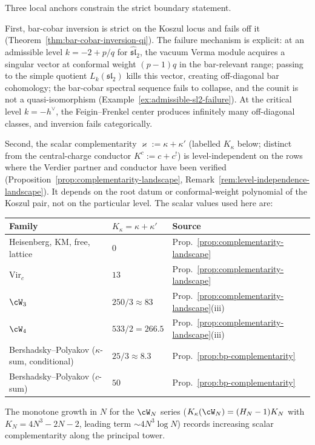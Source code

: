 \begin{remark}
\label{rem:koszul-swampland-evidence}
Three local anchors constrain the strict boundary statement.

First, bar-cobar inversion is strict on the Koszul locus
and fails off it
(Theorem~\ref{thm:bar-cobar-inversion-qi}).
The failure mechanism is explicit: at an admissible level
$k = -2 + p/q$ for $\widehat{\mathfrak{sl}}_2$, the
vacuum Verma module acquires a singular vector at
conformal weight $(p-1)q$ in the bar-relevant range; passing
to the simple quotient $L_k(\mathfrak{sl}_2)$ kills this
vector, creating off-diagonal bar cohomology; the bar-cobar
spectral sequence fails to collapse, and the counit is not a
quasi-isomorphism
(Example~\ref{ex:admissible-sl2-failure}).
At the critical level $k = -h^\vee$, the Feigin--Frenkel
center produces infinitely many off-diagonal classes, and
inversion fails categorically.

Second, the scalar complementarity $\varkappa := \kappa + \kappa'$
(labelled $K_\kappa$ below; distinct from the central-charge
conductor $K^c := c+c^!$) is level-independent on the rows where the
Verdier partner and conductor have been verified
(Proposition~\ref{prop:complementarity-landscape},
Remark~\ref{rem:level-independence-landscape}).
It depends on the root datum or conformal-weight polynomial of the
Koszul pair, not on the particular level. The scalar values used
here are:
\begin{center}
\small
\renewcommand{\arraystretch}{1.2}
\begin{tabular}{@{}lll@{}}
Family & $K_\kappa = \kappa + \kappa'$ & Source \\
\midrule
Heisenberg, KM, free, lattice & $0$ &
 Prop.~\ref{prop:complementarity-landscape} \\
$\mathrm{Vir}_c$ & $13$ &
 Prop.~\ref{prop:complementarity-landscape} \\
$\cW_3$ & $250/3 \approx 83$ &
 Prop.~\ref{prop:complementarity-landscape}(iii) \\
$\cW_4$ & $533/2 = 266.5$ &
 Prop.~\ref{prop:complementarity-landscape}(iii) \\
Bershadsky--Polyakov ($\kappa$-sum, conditional) & $25/3 \approx 8.3$
 & Prop.~\ref{prop:bp-complementarity} \\
Bershadsky--Polyakov ($c$-sum) & $50$
 & Prop.~\ref{prop:bp-complementarity} \\
\end{tabular}
\end{center}
The monotone growth in $N$ for the $\cW_N$ series
($K_\kappa(\cW_N) = (H_N-1)K_N$ with
$K_N = 4N^3 - 2N - 2$, leading term $\sim 4N^3 \log N$)
records increasing scalar complementarity along the principal tower.


\end{remark}
